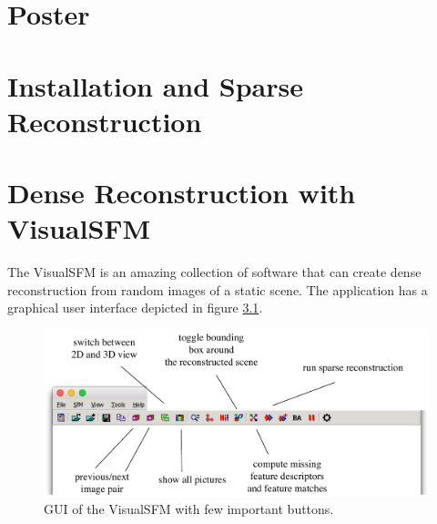 \chapter{Poster}
\chapter{Installation and Sparse Reconstruction}
\chapter{Dense Reconstruction with VisualSFM}
\label{visualsfm:reconstruction}
The VisualSFM is an amazing collection of software that can create dense reconstruction from random images of a static scene. The application has a graphical user interface depicted in figure \ref{fig:visualsfm-gui}.
\begin{figure}[h]
	\begin{center}
		\includegraphics[keepaspectratio,width=\textwidth]{fig/visualsfm-gui.pdf}
	\end{center}
	\caption{GUI of the VisualSFM with few important buttons.}
	\label{fig:visualsfm-gui}
\end{figure}
